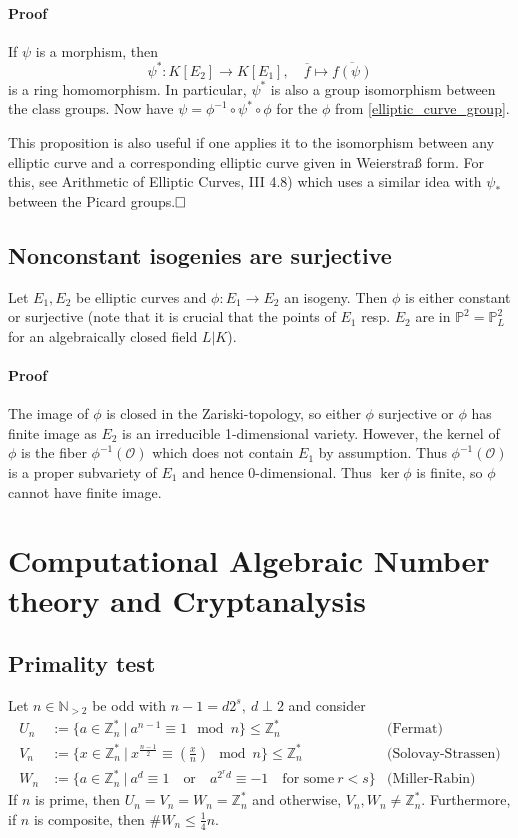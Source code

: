 \documentclass{scrartcl}
\newcommand{\N}{\mathbb{N}}
\newcommand{\Z}{\mathbb{Z}}
\begin{document}
\paragraph{Proof} If $\psi$ is a morphism, then
\begin{equation*}
    \psi^*: K[E_2] \to K[E_1], \quad \overline{f} \mapsto \overline{f(\psi)}
\end{equation*}
is a ring homomorphism. 
In particular, $\psi^*$ is also a group isomorphism between the class groups. 
Now have $\psi = \phi^{-1} \circ \psi^* \circ \phi$ for the $\phi$ from \ref{elliptic_curve_group}.

This proposition is also useful if one applies it to the isomorphism between any elliptic curve and a corresponding elliptic curve given in Weierstraß form.
For this, see Arithmetic of Elliptic Curves, III 4.8) which uses a similar idea with $\psi_*$ between the Picard groups.$\hfill\square$

\subsection{Nonconstant isogenies are surjective}
Let $E_1, E_2$ be elliptic curves and $\phi: E_1 \to E_2$ an isogeny.
Then $\phi$ is either constant or surjective (note that it is crucial that the points of $E_1$ resp. $E_2$ are in $\mathbb{P}^2 = \mathbb{P}^2_L$ for an algebraically closed field $L | K$).
\paragraph{Proof} The image of $\phi$ is closed in the Zariski-topology, so either $\phi$ surjective or $\phi$ has finite image as $E_2$ is an irreducible 1-dimensional variety.
However, the kernel of $\phi$ is the fiber $\phi^{-1}(\mathcal{O})$ which does not contain $E_1$ by assumption. Thus $\phi^{-1}(\mathcal{O})$ is a proper subvariety of $E_1$ and hence 0-dimensional.
Thus $\ker\phi$ is finite, so $\phi$ cannot have finite image.

\section{Computational Algebraic Number theory and Cryptanalysis}

\subsection{Primality test}
Let $n \in \N_{>2}$ be odd with $n - 1 = d2^s, \ d \perp 2$ and consider
\begin{align*}
    U_n &:= \{ a \in \Z_n^* \ | \ a^{n - 1} \equiv 1 \mod n \} \leq \Z_n^* & \text{(Fermat)}\\
    V_n &:= \{ x \in \Z_n^* \ | \ x^{\frac {n - 1} 2} \equiv \left(\frac x n\right) \mod n \} \leq \Z_n^* & \text{(Solovay-Strassen)}\\
    W_n &:= \{ a \in \Z_n^* \ | \ a^d \equiv 1 \quad \text{or} \quad a^{2^r d} \equiv -1 \quad \text{for some} \ r < s \} & \text{(Miller-Rabin)}
\end{align*}
If $n$ is prime, then $U_n = V_n = W_n = \Z_n^*$ and otherwise, $V_n, W_n \neq \Z_n^*$. Furthermore, if $n$ is composite, then $\#W_n \leq \frac 1 4 n$.
\end{document}
